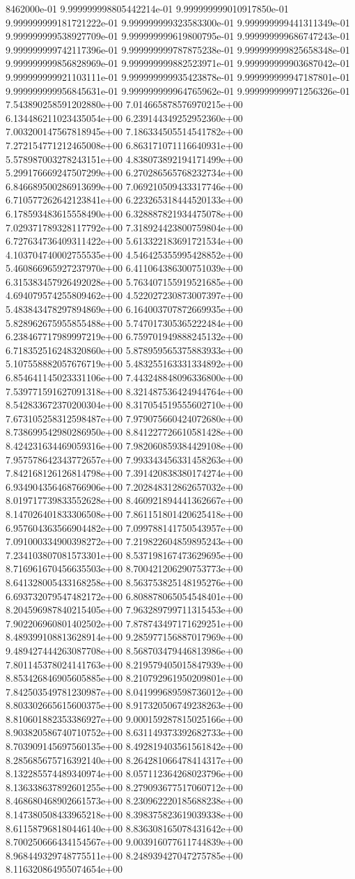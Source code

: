 8462000e-01	9.999999998805442214e-01	9.999999999010917850e-01	9.999999999181721222e-01	9.999999999323583300e-01	9.999999999441311349e-01	9.999999999538927709e-01	9.999999999619800795e-01	9.999999999686747243e-01	9.999999999742117396e-01	9.999999999787875238e-01	9.999999999825658348e-01	9.999999999856828969e-01	9.999999999882523971e-01	9.999999999903687042e-01	9.999999999921103111e-01	9.999999999935423878e-01	9.999999999947187801e-01	9.999999999956845631e-01	9.999999999964765962e-01	9.999999999971256326e-01
7.543890258591202880e+00	7.014665878576970215e+00	6.134486211023435054e+00	6.239144349252952360e+00	7.003200147567818945e+00	7.186334505514541782e+00	7.272154771212465008e+00	6.863171071116640931e+00	5.578987003278243151e+00	4.838073892194171499e+00	5.299176669247507299e+00	6.270286565768232734e+00	6.846689500286913699e+00	7.069210509433317746e+00	6.710577262642123841e+00	6.223265318444520133e+00	6.178593483615558490e+00	6.328887821934475078e+00	7.029371789328117792e+00	7.318924423800759804e+00	6.727634736409311422e+00	5.613322183691721534e+00	4.103704740002755535e+00	4.546425355995428852e+00	5.460866965927237970e+00	6.411064386300751039e+00	6.315383457926492028e+00	5.763407155919521685e+00	4.694079574255809462e+00	4.522027230873007397e+00	5.483843478297894869e+00	6.164003707872669935e+00	5.828962675955855488e+00	5.747017305365222484e+00	6.238467717989997219e+00	6.759701949888245132e+00	6.718352516248320860e+00	5.878959565375883933e+00	5.107558882057676719e+00	5.483255163331334892e+00	6.854641145023331106e+00	7.443248848096336800e+00	7.539771591627091318e+00	8.321487536424944764e+00	8.542833672370200304e+00	8.317054519555602710e+00	7.673105258312598487e+00	7.979075660424072680e+00	8.738699542980286950e+00	8.841227726610581428e+00	8.424231634469059316e+00	7.982060859384429108e+00	7.957578642343772657e+00	7.993343456331458263e+00	7.842168126126814798e+00	7.391420838380174274e+00	6.934904356468766906e+00	7.202848312862657032e+00	8.019717739833552628e+00	8.460921894441362667e+00	8.147026401833306508e+00	7.861151801420625418e+00	6.957604363566904482e+00	7.099788141750543957e+00	7.091000334900398272e+00	7.219822604859895243e+00	7.234103807081573301e+00	8.537198167473629695e+00	8.716961670456635503e+00	8.700421206290753773e+00	8.641328005433168258e+00	8.563753825148195276e+00	6.693732079547482172e+00	6.808878065054548401e+00	8.204596987840215405e+00	7.963289799711315453e+00	7.902206960801402502e+00	7.878743497171629251e+00	8.489399108813628914e+00	9.285977156887017969e+00	9.489427444263087708e+00	8.568703479446813986e+00	7.801145378024141763e+00	8.219579405015847939e+00	8.853426846905605885e+00	8.210792961950209801e+00	7.842503549781230987e+00	8.041999689598736012e+00	8.803302665615600375e+00	8.917320506749238263e+00	8.810601882353386927e+00	9.000159287815025166e+00	8.903820586740710752e+00	8.631149373392682733e+00	8.703909145697560135e+00	8.492819403561561842e+00	8.285685675716392140e+00	8.264281066478414317e+00	8.132285574489340974e+00	8.057112364268023796e+00	8.136338637892601255e+00	8.279093677517060712e+00	8.468680468902661573e+00	8.230962220185688238e+00	8.147380508433965218e+00	8.398375823619039338e+00	8.611587968180446140e+00	8.836308165078431642e+00	8.700250666434154567e+00	9.003916077611744839e+00	8.968449329748775511e+00	8.248939427047275785e+00	8.116320864955074654e+00